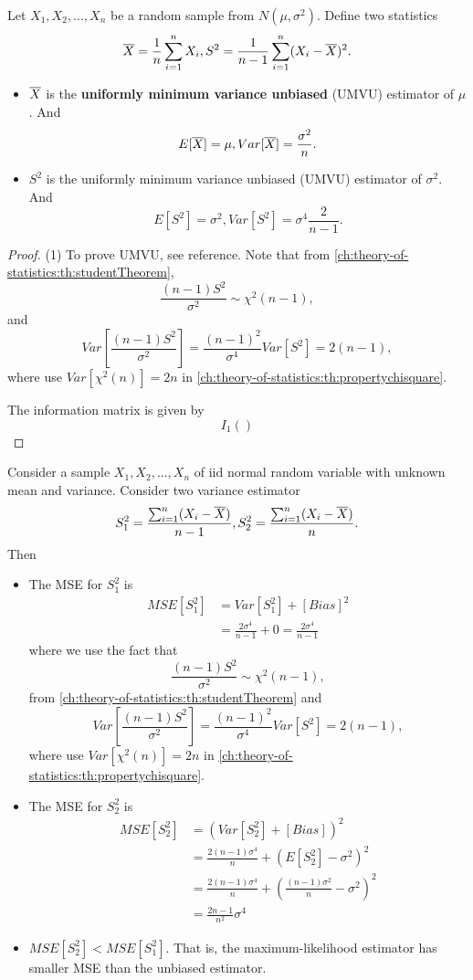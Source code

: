 \begin{refsection}
\begin{lemma}\cite{sciacchitano2015collaborative}
	Let $X_1,X_2,...,X_n$ be a random sample from $N(\mu, \sigma^2)$. Define two statistics
	$$\overline{X} = \frac{1}{n}\sum_{i=1}^n X_i, S^2 = \frac{1}{n-1}\sum_{i=1}^n (X_i - \overline{X})^2.$$
	\begin{itemize}
		\item $\overline{X}$ is the \textbf{uniformly minimum variance unbiased }(UMVU) estimator of $\mu$. And
		$$E[\overline{X}] = \mu, Var[\overline{X}] = \frac{\sigma^2}{n}.$$
		\item $S^2$ is the uniformly minimum variance unbiased (UMVU) estimator of $\sigma^2$. And
		$$E[S^2] = \sigma^2, Var[S^2] = \sigma^4\frac{2}{n-1}.$$
	\end{itemize}	
\end{lemma}
\begin{proof}
	(1) To prove UMVU, see reference. Note that from \autoref{ch:theory-of-statistics:th:studentTheorem},
	$$\frac{(n-1)S^2}{\sigma^2}\sim \chi^2({n-1}),$$
	and
	$$Var[\frac{(n-1)S^2}{\sigma^2}] = \frac{(n-1)^2}{\sigma^4}Var[S^2] = 2(n-1),$$
	where use $Var[\chi^2(n)] = 2n$ in \autoref{ch:theory-of-statistics:th:propertychisquare}.
	
	The information matrix is given by
	$$I_1()$$
\end{proof}


\begin{example}
	Consider a sample $X_1,X_2,...,X_n$ of iid normal random variable with unknown mean and variance. 
	Consider two variance estimator $$S_1^2 = \frac{\sum_{i=1}^{n} (X_i - \overline{X})}{n-1}, S_2^2 = \frac{\sum_{i=1}^{n} (X_i - \overline{X})}{n}.$$
	Then
	\begin{itemize}
		\item The MSE for $S_1^2$ is
		\begin{align*}
		MSE[S_1^2] &= Var[S_1^2] + [Bias]^2 \\
		&= \frac{2\sigma^4}{n-1} + 0 = \frac{2\sigma^4}{n-1}
		\end{align*}
		where we use the fact that 
		$$\frac{(n-1)S^2}{\sigma^2}\sim \chi^2({n-1}),$$
		from \autoref{ch:theory-of-statistics:th:studentTheorem} and
		$$Var[\frac{(n-1)S^2}{\sigma^2}] = \frac{(n-1)^2}{\sigma^4}Var[S^2] = 2(n-1),$$
		where use $Var[\chi^2(n)] = 2n$ in \autoref{ch:theory-of-statistics:th:propertychisquare}.
		\item The MSE for $S_2^2$ is
		\begin{align*}
		MSE[S_2^2] &= (Var[S_2^2] + [Bias])^2 \\
		&= \frac{2(n-1)\sigma^4}{n} + (E[S_2^2] - \sigma^2)^2 \\
		&= \frac{2(n-1)\sigma^4}{n} + (\frac{(n-1)\sigma^2}{n} - \sigma^2)^2 \\
		&= \frac{2n-1}{n^2}\sigma^4
		\end{align*}
		\item $MSE[S_2^2] < MSE[S_1^2]$. That is, the maximum-likelihood estimator has smaller MSE than the unbiased estimator.
		

\end{itemize}
\end{example}
\end{refsection}
